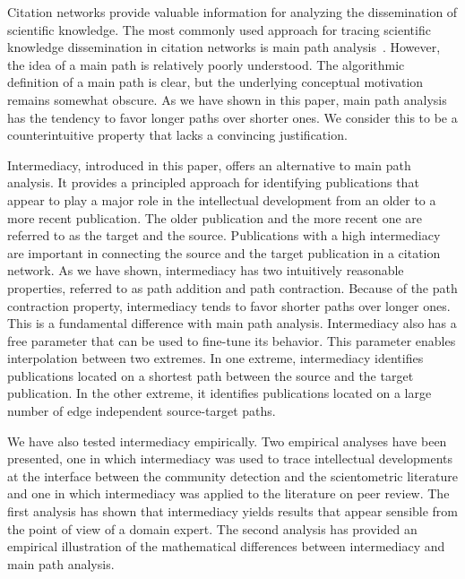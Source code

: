 \documentclass[9pt,twocolumn,twoside,lineno]{pnas-alt}
\theoremstyle{definition}
\begin{document}
Citation networks provide valuable information for analyzing the dissemination of scientific knowledge. The most commonly used approach for tracing scientific knowledge dissemination in citation networks is main path analysis~\cite{Hummon1989}. However, the idea of a main path is relatively poorly understood. The algorithmic definition of a main path is clear, but the underlying conceptual motivation remains somewhat obscure. As we have shown in this paper, main path analysis has the tendency to favor longer paths over shorter ones. We consider this to be a counterintuitive property that lacks a convincing justification.

Intermediacy, introduced in this paper, offers an alternative to main path analysis. It provides a principled approach for identifying publications that appear to play a major role in the intellectual development from an older to a more recent publication. The older publication and the more recent one are referred to as the target and the source. Publications with a high intermediacy are important in connecting the source and the target publication in a citation network. As we have shown, intermediacy has two intuitively reasonable properties, referred to as path addition and path contraction. Because of the path contraction property, intermediacy tends to favor shorter paths over longer ones. This is a fundamental difference with main path analysis. Intermediacy also has a free parameter that can be used to fine-tune its behavior. This parameter enables interpolation between two extremes. In one extreme, intermediacy identifies publications located on a shortest path between the source and the target publication. In the other extreme, it identifies publications located on a large number of edge independent source-target paths.

We have also tested intermediacy empirically. Two empirical analyses have been presented, one in which intermediacy was used to trace intellectual developments at the interface between the community detection and the scientometric literature and one in which intermediacy was applied to the literature on peer review. The first analysis has shown that intermediacy yields results that appear sensible from the point of view of a domain expert. The second analysis has provided an empirical illustration of the mathematical differences between intermediacy and main path analysis.
\end{document}
